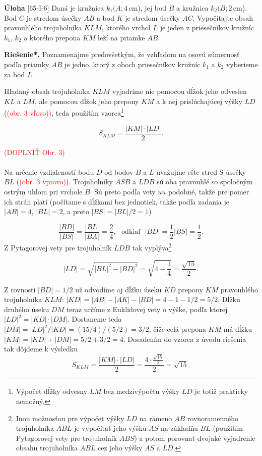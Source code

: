 \documentclass{article}
\newcommand{\rieh}{\textbf{Riešenie*.} }
\newcommand\todo[1]{\noindent\textcolor{red}{(#1)}}
\newcommand{\problem}[3]{
  \begin{tcolorbox}[breakable,notitle,boxrule=0pt,colback=light-gray,colframe=light-gray]
    \textbf{Úloha}
    [#1] #2
  \end{tcolorbox}
  \noindent#3
}
\begin{document}
\problem{65-I-6}{
Daná je kružnica $k_1 (A; 4$\,cm), jej bod $B$ a kružnica $k_2 (B; 2$\,cm). Bod $C$ je stredom úsečky $AB$ a bod $K$ je stredom úsečky $AC$. Vypočítajte obsah pravouhlého trojuholníka $KLM$, ktorého vrchol $L$ je jeden z priesečníkov kružníc $k_1$, $k_2$ a ktorého prepona $KM$ leží na priamke $AB$.
}{


\rieh Poznamenajme predovšetkým, že vzhľadom na osovú súmernosť podľa priamky $AB$ je jedno, ktorý z oboch priesečníkov kružníc $k_1$ a $k_2$ vyberieme za bod $L$.

Hľadaný obsah trojuholníka $KLM$ vyjadríme nie pomocou dĺžok jeho odvesien $KL$ a $LM$, ale pomocou dĺžok jeho prepony $KM$ a k nej prislúchajúcej výšky $LD$ (\todo{obr. 3 vľavo)}, teda použitím vzorca\footnote{Výpočet dĺžky odvesny $LM$ bez medzivýpočtu výšky $LD$ je totiž prakticky nemožný.}


$$S_{KLM} = \frac{|KM| \cdot |LD|}{2}.$$

\todo{DOPLNIŤ Obr. 3}\\
\\
Na určenie vzdialeností bodu $D$ od bodov $B$ a $L$ uvažujme ešte stred S úsečky $BL$ (\todo{obr. 3 vpravo}). Trojuholníky $ASB$ a $LDB$ sú oba pravouhlé so spoločným ostrým uhlom pri vrchole $B$. Sú preto podľa vety $uu$ podobné, takže pre pomer ich strán platí (počítame s dĺžkami bez jednotiek, takže podľa zadania je $|AB| = 4$, $|BL| = 2$, a preto $|BS| = |BL|/2 = 1$)

$$\frac{|BD|}{|BS|}=\frac{|BL|}{|BA|}=\frac{2}{4}, \ \ \ \text{odkiaľ} \ \ \ |BD| =\frac{1}{2}|BS| =\frac{1}{2}.$$
Z Pytagorovej vety pre trojuholník $LDB$ tak vyplýva\footnote{Inou možnosťou pre výpočet výšky $LD$ na rameno $AB$ rovnoramenného trojuholníka $ABL$ je vypočítať jeho výšku $AS$ na základňu $BL$ (použitím Pytagorovej vety pre trojuholník $ABS$) a potom porovnať dvojaké vyjadrenie obsahu trojuholníka $ABL$ cez jeho výšky $AS$ a $LD$.}

$$|LD| =\sqrt{|BL|^2-|BD|^2}=\sqrt{4-\frac{1}{4}}=\frac{\sqrt{15}}{2}.$$

Z rovnosti $|BD| = 1/2$ už odvodíme aj dĺžku úseku $KD$ prepony $KM$ pravouhlého trojuholníka $KLM$: $|KD| = |AB| - |AK| - |BD| = 4 - 1 - 1/2 = 5/2$. Dĺžku druhého úseku $DM$ teraz určíme z Euklidovej vety o výške, podľa ktorej $|LD|^2 = |KD| \cdot |DM|$. Dostaneme teda $|DM| = |LD|^2 /|KD| = (15/4)/(5/2) = 3/2$, čiže celá prepona $KM$ má dĺžku $|KM| = |KD| + |DM| = 5/2 + 3/2 = 4$. Dosadením do vzorca z úvodu riešenia tak dôjdeme k výsledku
$$S_{KLM} = \frac{|KM| \cdot |LD|}{2}=\frac{4 \cdot \frac{\sqrt{15}}{2}}{2}=\sqrt{15}.$$


}
\end{document}
